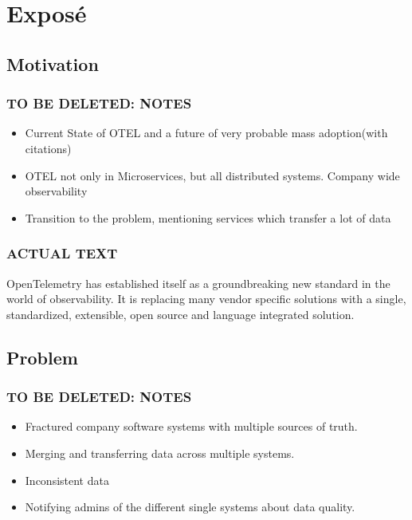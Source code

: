 \chapter{Exposé}

\section{Motivation}

\subsection{TO BE DELETED: NOTES}

\begin{itemize}
	\item Current State of OTEL and a future of very probable mass adoption(with citations)
	\item OTEL not only in Microservices, but all distributed systems. Company wide observability
	\item Transition to the problem, mentioning services which transfer a lot of data
\end{itemize}

\subsection{ACTUAL TEXT}

OpenTelemetry has established itself as a groundbreaking new standard in the world of observability.
It is replacing many vendor specific solutions with a single, standardized, extensible, open source
and language integrated solution.

\section{Problem}

\subsection{TO BE DELETED: NOTES}

\begin{itemize}
	\item Fractured company software systems with multiple sources of truth.
	\item Merging and transferring data across multiple systems.
	\item Inconsistent data
	\item Notifying admins of the different single systems about data quality.
\end{itemize}

